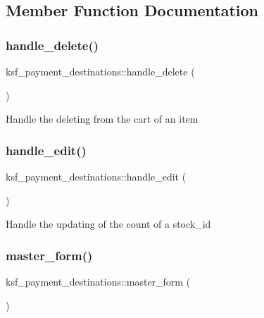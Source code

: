 \subsection{Member Function Documentation}
\hypertarget{classksf__payment__destinations_a617a0cadddf6ade17f478e8476449871}{}\label{classksf__payment__destinations_a617a0cadddf6ade17f478e8476449871} 
\subsubsection{\texorpdfstring{handle\+\_\+delete()}{handle\_delete()}}
{\footnotesize\ttfamily ksf\+\_\+payment\+\_\+destinations\+::handle\+\_\+delete (\begin{DoxyParamCaption}{ }\end{DoxyParamCaption})}

Handle the deleting from the cart of an item \hypertarget{classksf__payment__destinations_a7078c43829c1b6a6222e2930d99d0608}{}\label{classksf__payment__destinations_a7078c43829c1b6a6222e2930d99d0608} 
\subsubsection{\texorpdfstring{handle\+\_\+edit()}{handle\_edit()}}
{\footnotesize\ttfamily ksf\+\_\+payment\+\_\+destinations\+::handle\+\_\+edit (\begin{DoxyParamCaption}{ }\end{DoxyParamCaption})}

Handle the updating of the count of a stock\+\_\+id \hypertarget{classksf__payment__destinations_af957fcc97c11896268883359ff45ddd4}{}\label{classksf__payment__destinations_af957fcc97c11896268883359ff45ddd4} 
\subsubsection{\texorpdfstring{master\+\_\+form()}{master\_form()}}
{\footnotesize\ttfamily ksf\+\_\+payment\+\_\+destinations\+::master\+\_\+form (\begin{DoxyParamCaption}{ }\end{DoxyParamCaption})}

